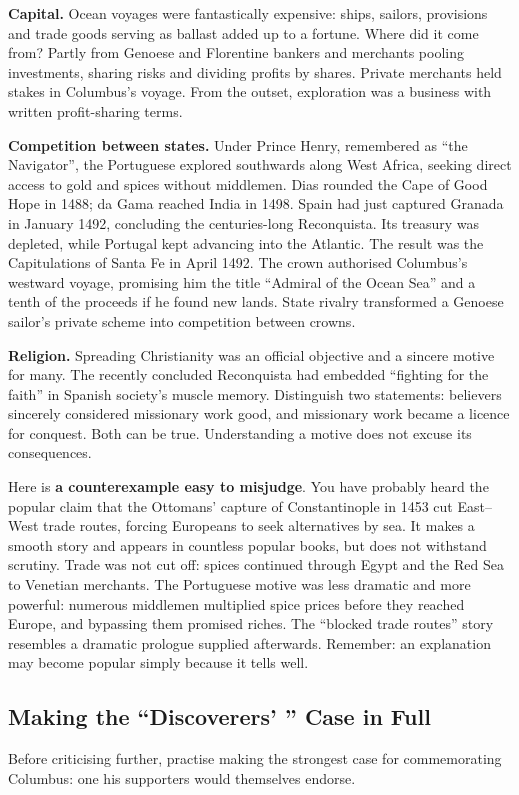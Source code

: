 \textbf{Capital.} Ocean voyages were fantastically expensive: ships, sailors, provisions and trade goods serving as ballast added up to a fortune. Where did it come from? Partly from Genoese and Florentine bankers and merchants pooling investments, sharing risks and dividing profits by shares. Private merchants held stakes in Columbus's voyage. From the outset, exploration was a business with written profit-sharing terms.

\textbf{Competition between states.} Under Prince Henry, remembered as ``the Navigator'', the Portuguese explored southwards along West Africa, seeking direct access to gold and spices without middlemen. Dias rounded the Cape of Good Hope in 1488; da Gama reached India in 1498. Spain had just captured Granada in January 1492, concluding the centuries-long Reconquista. Its treasury was depleted, while Portugal kept advancing into the Atlantic. The result was the Capitulations of Santa Fe in April 1492. The crown authorised Columbus's westward voyage, promising him the title ``Admiral of the Ocean Sea'' and a tenth of the proceeds if he found new lands. State rivalry transformed a Genoese sailor's private scheme into competition between crowns.

\textbf{Religion.} Spreading Christianity was an official objective and a sincere motive for many. The recently concluded Reconquista had embedded ``fighting for the faith'' in Spanish society's muscle memory. Distinguish two statements: believers sincerely considered missionary work good, and missionary work became a licence for conquest. Both can be true. Understanding a motive does not excuse its consequences.

Here is \textbf{a counterexample easy to misjudge}. You have probably heard the popular claim that the Ottomans' capture of Constantinople in 1453 cut East--West trade routes, forcing Europeans to seek alternatives by sea. It makes a smooth story and appears in countless popular books, but does not withstand scrutiny. Trade was not cut off: spices continued through Egypt and the Red Sea to Venetian merchants. The Portuguese motive was less dramatic and more powerful: numerous middlemen multiplied spice prices before they reached Europe, and bypassing them promised riches. The ``blocked trade routes'' story resembles a dramatic prologue supplied afterwards. Remember: an explanation may become popular simply because it tells well.

\subsection[The Strongest Case for Commemoration]{Making the ``Discoverers' '' Case in Full}
Before criticising further, practise making the strongest case for commemorating Columbus: one his supporters would themselves endorse.

